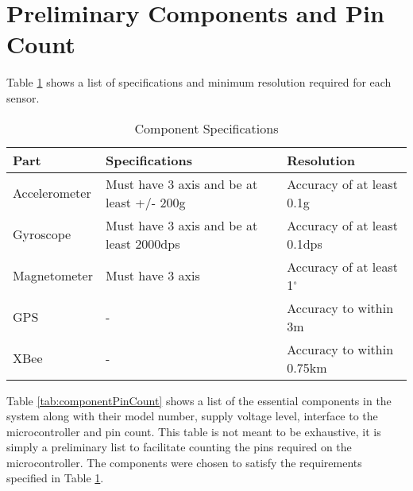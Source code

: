 \section{Preliminary Components and Pin Count}

Table \ref{tab:sensorResolution} shows a list of specifications and minimum resolution required for each sensor.

\begin{table}[H]
\setlength{\extrarowheight}{1.5pt}
  \centering
  \caption{Component Specifications}
    \begin{tabular}{|m{1in}|m{2.2in}|m{2.2in}|}
    \hline
     Part  &  Specifications &  Resolution \\
    \hline \hline
    Accelerometer & Must have 3 axis and be at least +/- 200g & Accuracy of at least 0.1g \\ \hline
    Gyroscope & Must have 3 axis and be at least 2000dps & Accuracy of at least 0.1dps \\ \hline
    Magnetometer & Must have 3 axis & Accuracy of at least 1$^{\circ}$ \\ \hline
    GPS   & - & Accuracy to within 3m  \\ \hline 
    XBee  & - & Accuracy to within 0.75km\\ \hline
    
    \end{tabular}%
  \label{tab:sensorResolution}%
\end{table}%

Table \ref{tab:componentPinCount} shows a list of the essential components in the system along with their model number, supply voltage level, interface to the microcontroller and pin count.  This table is not meant to be exhaustive, it is simply a preliminary list to facilitate counting the pins required on the microcontroller. The components were chosen to satisfy the requirements specified in Table \ref{tab:sensorResolution}.

